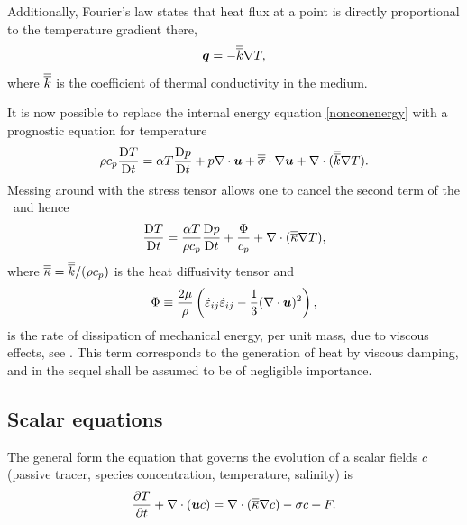 Additionally, Fourier's law states that heat flux at a point is directly proportional to the temperature gradient there, \ie
\begin{equation}
{\mbox{\boldmath$q$}} = -\overline{\overline{k}}\nabla T,
\end{equation}
where $\overline{\overline{k}}$ is the coefficient of thermal conductivity in the medium.

It is now possible to replace the internal energy equation \ref{nonconenergy} with a prognostic equation for temperature
\begin{equation}
\rho c_p \frac{\mathrm{D} T}{\mathrm{D} t} =\alpha T\frac{\mathrm{D} p}{\mathrm{D} t} + p\nabla\cdot{\mbox{\boldmath$u$}}
+\overline{\overline{\sigma}}\cdot\nabla{\mbox{\boldmath$u$}} + \nabla\cdot(\overline{\overline{k}}\nabla T).
\end{equation}
Messing around with the stress tensor allows one to cancel the second term of the \rhs\ and hence
\begin{equation}
\frac{\mathrm{D} T}{\mathrm{D} t} =\frac{\alpha T}{\rho c_p}\frac{\mathrm{D} p}{\mathrm{D} t} +
\frac{\Phi}{c_p} + \nabla\cdot(\overline{\overline{\kappa}}\nabla T),
\end{equation}
where $\overline{\overline{\kappa}} = \overline{\overline{k}}/(\rho c_p)$ is the heat diffusivity tensor and
\begin{equation}
\Phi \equiv \frac{2\mu}{\rho}\left(\dot{\varepsilon}_{ij}\dot{\varepsilon}_{ij}
-\frac{1}{3}(\nabla\cdot{\mbox{\boldmath$u$}})^2\right),
\end{equation}
is the rate of dissipation of mechanical energy, per unit mass, due to viscous effects, see \cite[Sections 3.4 and 3.6]{batchelor_1967}. This term corresponds to the generation of heat by viscous damping, and in the sequel shall be assumed to be of negligible importance.

\subsection{Scalar equations}
The general form the equation that governs the evolution of a scalar fields $c$ (\eg passive tracer, species concentration, temperature, salinity) is
\begin{equation}\label{eq:general_scalar_eqn}
\frac{\partial T}{\partial t} + \nabla\cdot({\mbox{\boldmath$u$}} c) = \nabla\cdot(\overline{\overline{\kappa}}\nabla c) - \sigma c + F.
\end{equation}


